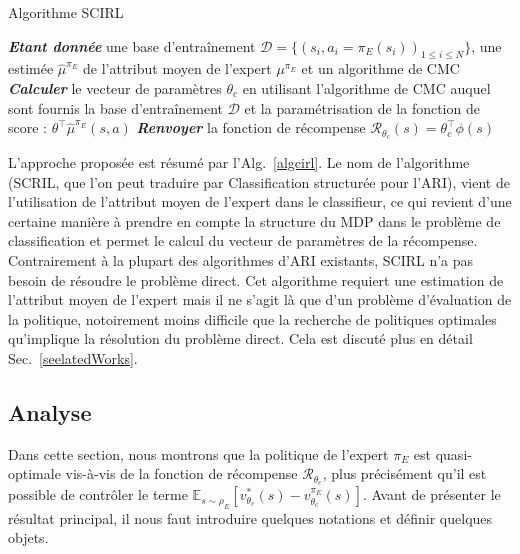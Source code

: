 \documentclass[french,utf8]{./hermes-journal}
\newcommand{\R}{\mathcal{R}}
\newcommand{\D}{\mathcal{D}}
\newcommand{\E}{\mathbb{E}}
\begin{document}
\begin{algorithm2e}%
  \SetAlgoVlined
  \caption{Algorithme SCIRL}
  \label{algcirl}
  \BlankLine
  \emph{\textbf{Etant donnée}} une base d'entraînement $\D = \{(s_i,a_i=\pi_E(s_i))_{1\leq i\leq N}\}$,
  une estimée $\hat{\mu}^{\pi_E}$ de l'attribut moyen de l'expert $\mu^{\pi_E}$ et un algorithme de CMC\;
  \BlankLine
  \emph{\textbf{Calculer}} le vecteur de paramètres $\theta_c$ en utilisant l'algorithme de CMC auquel sont fournis la base d'entraînement $\D$ et la paramétrisation de la fonction de score : $\theta^\top\hat{\mu}^{\pi_E}(s,a)$\;
  \BlankLine
  \emph{\textbf{Renvoyer}} la fonction de récompense $\R_{\theta_c}(s) = \theta_c^\top\phi(s)$ \;
\end{algorithm2e}

L'approche proposée est résumé par l'Alg.~\ref{algcirl}. Le nom de l'algorithme (SCRIL, que l'on peut traduire par Classification structurée pour l'ARI), vient de l'utilisation de l'attribut moyen de l'expert dans le classifieur, ce qui revient d'une certaine manière à prendre en compte la structure du MDP dans le problème de classification et permet le calcul du vecteur de paramètres de la récompense. Contrairement à la plupart des algorithmes d'ARI existants, SCIRL n'a pas besoin de résoudre le problème direct. Cet algorithme requiert une estimation de l'attribut moyen de l'expert mais il ne s'agit là que d'un problème d'évaluation de la politique, notoirement moins difficile que la recherche de politiques optimales qu'implique la résolution du problème direct. Cela est discuté plus en détail Sec.~\ref{seelatedWorks}.
%


\subsection{Analyse}
\label{subsecirnalysis}

Dans cette section, nous montrons que la politique de l'expert $\pi_E$ est quasi-optimale vis-à-vis de la fonction de récompense $\R_{\theta_c}$, plus précisément qu'il est possible de contrôler le terme
$\E_{s\sim\rho_E}[v^*_{\theta_c}(s)-v^{\pi_E}_{\theta_c}(s)]$.
Avant de présenter le résultat principal, il nous faut introduire quelques notations et définir quelques objets.
\end{document}
